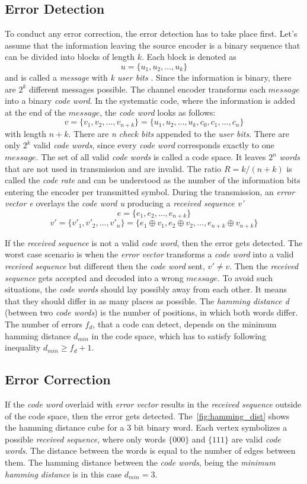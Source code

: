 \subsection{Error Detection}
To conduct any error correction, the error detection has to take place first. Let's assume that the information leaving the source encoder is a binary sequence that can be divided into blocks of length $k$. Each block is denoted as 
$$u=\{u_1,u_2,...,u_k\}$$ 
and is called a \textit{message} with \textit{k user bits} . Since the information is binary, there are $2^k$ different messages possible. The channel encoder transforms each $message$ into a binary \textit{code word}. In the systematic code, where the information is added at the end of the $message$, the \textit{code word} looks as follows:
$$v=\{v_1,v_2,...,v_{n+k}\} = \{u_1,u_2,...,u_k, c_0,c_1,...,c_{n}\}$$ 
with length $n+k$. There are \textit{n check bits} appended to the \textit{user bits}. There are only $2^k$ valid \textit{code words}, since every \textit{code word} corresponds exactly to one $message$. The set of all valid \textit{code words} is called a code space. It leaves $2^n$ \textit{words} that are not used in transmission and are invalid. The ratio $R=k/(n+k)$ is called the \textit{code rate} and can be understood as the number of the information bits entering the encoder per transmitted symbol. During the transmission, an \textit{error vector e} overlays the \textit{code word u} producing a \textit{received sequence v'} 
$$e=\{e_1,e_2,...,e_{n+k}\}$$ 
$$v'=\{v'_1,v'_2,...,v'_n\} = \{e_1 \oplus v_1, e_2 \oplus v_2,...,e_{n+k} \oplus v_{n+k} \}$$

If the \textit{received sequence} is not a valid \textit{code word}, then the error gets detected. The worst case scenario is when the \textit{error vector} transforms a \textit{code word} into a valid \textit{received sequence} but different then the \textit{code word} sent, $v'\neq v$. Then the \textit{received sequence} gets accepted and decoded into a wrong $message$. To avoid such situations, the \textit{code words} should lay possibly away from each other. It means that they should differ in as many places as possible. The \textit{hamming distance d} (between two \textit{code words}) is the number of positions, in which both words differ. The number of errors $f_d$, that a code can detect, depends on the minimum hamming distance $d_{min}$ in the code space, which has to satisfy following inequality $d_{min} \geq f_d + 1$.
\subsection{Error Correction}
If the \textit{code word} overlaid with \textit{error vector} results in the \textit{received sequence} outside of the code space, then the error gets detected. The~\autoref{fig:hamming_dist} shows the hamming distance cube for a 3 bit binary word. Each vertex symbolizes a possible \textit{received sequence}, where only words $\{000\}$ and $\{111\}$ are valid \textit{code words}. The distance between the words is equal to the number of edges between them. The hamming distance between the \textit{code words}, being the \textit{minimum hamming distance} is in this case $d_{min}=3$.


